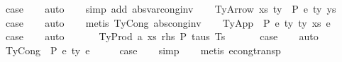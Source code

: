 \begin{isabellebody}
\ {\isacharquery}{\kern0pt}case\isanewline
\ \ \isamarkupfalse%
\ auto\isanewline
\ \ \isamarkupfalse%
\ {\isacharparenleft}{\kern0pt}simp\ add{\isacharcolon}{\kern0pt}\ abs{\isacharunderscore}{\kern0pt}var{\isacharunderscore}{\kern0pt}cong{\isacharunderscore}{\kern0pt}inv{\isacharparenright}{\kern0pt}\isanewline
{}\isamarkupfalse%
\isanewline
\ \ \isamarkupfalse%
\ {\isacharparenleft}{\kern0pt}TyArrow\ xs{\isacharprime}{\kern0pt}\ ty{}{\isacharprime}{\kern0pt}\ {\isasymGamma}{\isacharprime}{\kern0pt}\ P\ e{\isacharprime}{\kern0pt}\ ty{}{\isacharprime}{\kern0pt}\ ys{\isacharprime}{\kern0pt}{\isacharparenright}{\kern0pt}\isanewline
\ \ \isamarkupfalse%
\ \isamarkupfalse%
\ {\isacharquery}{\kern0pt}case\isanewline
\ \ \isamarkupfalse%
\ auto\isanewline
\ \ \isamarkupfalse%
\ {\isacharparenleft}{\kern0pt}metis\ TyCong\ abs{\isacharunderscore}{\kern0pt}cong{\isacharunderscore}{\kern0pt}inv{\isacharparenright}{\kern0pt}\isanewline
{}\isamarkupfalse%
\isanewline
\ \ \isamarkupfalse%
\ {\isacharparenleft}{\kern0pt}TyApp\ {\isasymGamma}\ P\ e{}\ ty{}\ ty{}\ xs\ e{}{\isacharparenright}{\kern0pt}\isanewline
\ \ \isamarkupfalse%
\ \isamarkupfalse%
\ {\isacharquery}{\kern0pt}case\isanewline
\ \ \isamarkupfalse%
\ auto\isanewline
\ \ \isamarkupfalse%
\isanewline
{}\isamarkupfalse%
\isanewline
\ \ \isamarkupfalse%
\ {\isacharparenleft}{\kern0pt}TyProd\ a\ xs\ rhs\ P\ taus\ Ts\ {\isasymGamma}{\isacharparenright}{\kern0pt}\isanewline
\ \ \isamarkupfalse%
\ \isamarkupfalse%
\ {\isacharquery}{\kern0pt}case\isanewline
\ \ \isamarkupfalse%
\ auto\isanewline
\ \ \isamarkupfalse%
\isanewline
{}\isamarkupfalse%
\isanewline
\ \ \isamarkupfalse%
\ {\isacharparenleft}{\kern0pt}TyCong\ {\isasymGamma}\ P\ e{}\ ty\ e{}{\isacharparenright}{\kern0pt}\isanewline
\ \ \isamarkupfalse%
\ \isamarkupfalse%
\ {\isacharquery}{\kern0pt}case\isanewline
\ \ \isamarkupfalse%
\ simp\isanewline
\ \ \isamarkupfalse%
\ {\isacharparenleft}{\kern0pt}metis\ econg{\isacharunderscore}{\kern0pt}transp{\isacharparenright}{\kern0pt}\isanewline

\end{isabellebody}
